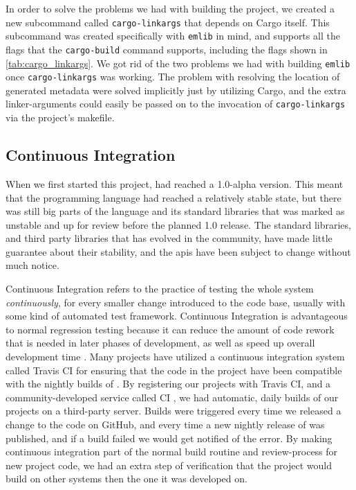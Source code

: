 In order to solve the problems we had with building the project, we created a new subcommand called \texttt{cargo-linkargs} \cite{github:cargo_linkargs} that depends on Cargo itself.
This subcommand was created specifically with \texttt{emlib} in mind, and supports all the flags that the \texttt{cargo-build} command supports, including the flags shown in \autoref{tab:cargo_linkargs}.
We got rid of the two problems we had with building \texttt{emlib} once \texttt{cargo-linkargs} was working.
The problem with resolving the location of generated metadata were solved implicitly just by utilizing Cargo, and the extra linker-arguments could easily be passed on to the invocation of \texttt{cargo-linkargs} via the project's makefile.

\subsection{Continuous Integration}
\label{ssub:continuous_integration}

When we first started this project, {\rust} had reached a 1.0-alpha version.
This meant that the programming language had reached a relatively stable state, but there was still big parts of the language and its standard libraries that was marked as unstable and up for review before the planned 1.0 release.
The standard libraries, and third party {\rust} libraries that has evolved in the {\rust} community, have made little guarantee about their stability, and the \glspl{api} have been subject to change without much notice.

Continuous Integration refers to the practice of testing the whole system \emph{continuously}, for every smaller change introduced to the code base, usually with some kind of automated test framework.
Continuous Integration is advantageous to normal regression testing because it can reduce the amount of code rework that is needed in later phases of development, as well as speed up overall development time  \cite{Orso2014}.
Many {\rust} projects have utilized a continuous integration system called Travis CI \cite{web:travis_ci} for ensuring that the code in the project have been compatible with the nightly builds of {\rust}.
By registering our projects with Travis CI, and a community-developed service called {\rust} CI \cite{web:rust_ci}, we had automatic, daily builds of our projects on a third-party server.
Builds were triggered every time we released a change to the code on GitHub, and every time a new nightly release of {\rust} was published, and if a build failed we would get notified of the error.
By making continuous integration part of the normal build routine and review-process for new project code, we had an extra step of verification that the project would build on other systems then the one it was developed on.

